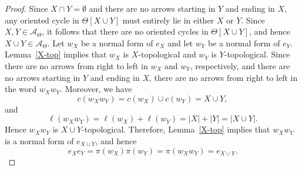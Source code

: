 \documentclass[pdflatex,sn-mathphys-num]{sn-jnl}
\theoremstyle{definition}
\theoremstyle{remark}
\begin{document}
\begin{proof}
   Since $X \cap Y = \emptyset$ and there are no arrows starting in $Y$ and ending in $X$, any oriented cycle in $\Theta[X \cup Y]$ must entirely lie in either $X$ or $Y$.
   Since $X, Y \in \mathcal{A}_{\Theta}$, it follows that there are no oriented cycles in $\Theta[X \cup Y]$, and hence $X \cup Y \in \mathcal{A}_{\Theta}$.
   Let $w_X$ be a normal form of $e_X$ and let $w_Y$ be a normal form of $e_Y$.
   Lemma~\ref{X-top} implies that $w_X$ is $X$-topological and $w_Y$ is $Y$-topological.
   Since there are no arrows from right to left in $w_X$ and $w_Y$, respectively, and there are no arrows starting in $Y$ and ending in $X$, there are no arrows from right to left in the word $w_X w_Y$.
   Moreover, we have
   \[
   c(w_X w_Y) = c(w_X) \cup c(w_Y) = X \cup Y,
   \]
   and 
   \[
   \ell(w_X w_Y) = \ell(w_X) + \ell(w_Y) = |X| + |Y| = |X \cup Y|.
   \]
   Hence $w_X w_Y$ is $X \cup Y$-topological.
   Therefore, Lemma~\ref{X-top} implies that $w_X w_Y$ is a normal form of $e_{X \cup Y}$, and hence
   \[
   e_X e_Y = \pi(w_X) \pi(w_Y) = \pi(w_X w_Y) = e_{X \cup Y}.
   \]
\end{proof}
\end{document}
